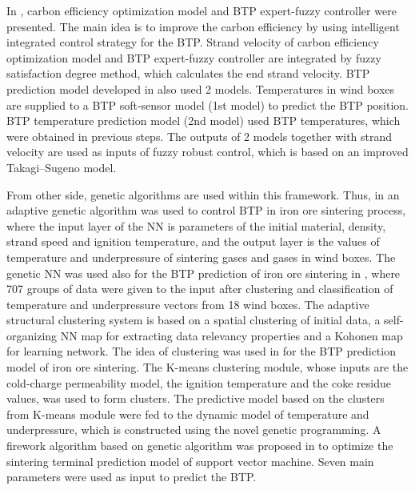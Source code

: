 \documentclass[AMS,STIX2COL]{WileyNJD-v2}
\begin{document}
In \cite{Du2019}, carbon efficiency optimization model and BTP expert-fuzzy controller were presented. The main idea is to improve the carbon efficiency by using intelligent integrated control strategy for the BTP. Strand velocity of carbon efficiency optimization model and BTP expert-fuzzy controller are integrated by fuzzy satisfaction degree method, which calculates the end strand velocity.
BTP prediction model developed in \cite{Chen2017} also used 2 models.
Temperatures in wind boxes are supplied to a BTP soft-sensor model (1st model) to predict the BTP position. BTP temperature prediction model (2nd model) used BTP temperatures, which were obtained in previous steps. The outputs of 2 models  together with strand velocity are used as inputs of fuzzy robust control, which is based on an improved Takagi–Sugeno model.

From other side, genetic algorithms are used within this framework. Thus, in \cite{Wu-ShanCheng2005} an adaptive genetic algorithm was used to control BTP in iron ore sintering process, where the input layer of the NN is parameters of the initial material, density, strand speed and ignition temperature, and the output layer is the values of temperature and underpressure of sintering gases and gases in wind boxes. The genetic NN was used also for the BTP prediction of iron ore sintering in \cite{Cheng2006}, where 707 groups of data were given to the input after clustering and classification of temperature and underpressure vectors from 18 wind boxes. The adaptive structural clustering system is based on a spatial clustering of initial data, a self-organizing NN map for extracting data relevancy properties and a Kohonen map for learning network. The idea of clustering was used in \cite{Shang2010} for the BTP prediction model of iron ore sintering. The K-means clustering module, whose inputs are the cold-charge permeability model, the ignition temperature and the coke residue values, was used to form clusters. The predictive model based on the clusters from K-means module were fed to the dynamic model of temperature and underpressure, which is constructed using the novel genetic programming. A firework algorithm based on genetic algorithm was proposed in \cite{Wang2018} to optimize the sintering terminal prediction model of support vector machine. Seven main parameters were used as input to predict the BTP.
\end{document}
